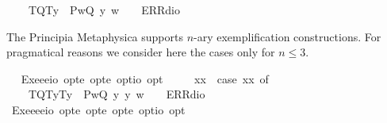 \begin{isabellebody}
\ \ \ \ {\isacharparenleft}T{\isacharparenleft}Q{\isacharparenright}{\isacharcomma}T{\isacharparenleft}y{\isacharparenright}{\isacharparenright}\ {\isasymRightarrow}\ P{\isacharparenleft}{\isasymlambda}w{\isachardot}{\isacharparenleft}Q\ y{\isacharparenright}\ w{\isacharparenright}\ {\isacharbar}\ {\isacharunderscore}\ {\isasymRightarrow}\ ERR{\isacharparenleft}dio{\isacharparenright}{\isachardoublequoteclose}%
\begin{isamarkuptext}%
The Principia Metaphysica supports $n$-ary exemplification constructions. For pragmatical 
  reasons we consider here the cases only for $n\leq 3$.%
\end{isamarkuptext}%
\isamarkuptrue%
\ \isamarkupfalse%
\ Exe{}{\isacharcolon}{\isacharcolon}{\isachardoublequoteopen}{\isacharparenleft}e{\isasymRightarrow}e{\isasymRightarrow}io{\isacharparenright}\ opt{\isasymRightarrow}e\ opt{\isasymRightarrow}e\ opt{\isasymRightarrow}io\ opt{\isachardoublequoteclose}\ {\isacharparenleft}{\isachardoublequoteopen}{\isasymlparr}{\isacharunderscore}{\isacharcomma}{\isacharunderscore}{\isacharcomma}{\isacharunderscore}{\isasymrparr}{\isachardoublequoteclose}{\isacharparenright}\ \isanewline
\ \ \ {\isachardoublequoteopen}{\isasymlparr}{\isasymPhi}{\isacharcomma}x{}{\isacharcomma}x{}{\isasymrparr}\ {\isasymequiv}\ case\ {\isacharparenleft}{\isasymPhi}{\isacharcomma}x{}{\isacharcomma}x{}{\isacharparenright}\ of\ \isanewline
\ \ \ \ {\isacharparenleft}T{\isacharparenleft}Q{\isacharparenright}{\isacharcomma}T{\isacharparenleft}y{}{\isacharparenright}{\isacharcomma}T{\isacharparenleft}y{}{\isacharparenright}{\isacharparenright}\ {\isasymRightarrow}\ P{\isacharparenleft}{\isasymlambda}w{\isachardot}{\isacharparenleft}Q\ y{}\ y{}{\isacharparenright}\ w{\isacharparenright}\ {\isacharbar}\ {\isacharunderscore}\ {\isasymRightarrow}\ ERR{\isacharparenleft}dio{\isacharparenright}{\isachardoublequoteclose}\isanewline
\ \isamarkupfalse%
\ Exe{}{\isacharcolon}{\isacharcolon}{\isachardoublequoteopen}{\isacharparenleft}e{\isasymRightarrow}e{\isasymRightarrow}e{\isasymRightarrow}io{\isacharparenright}\ opt{\isasymRightarrow}e\ opt{\isasymRightarrow}e\ opt{\isasymRightarrow}e\ opt{\isasymRightarrow}io\ opt{\isachardoublequoteclose}\ {\isacharparenleft}{\isachardoublequoteopen}{\isasymlparr}{\isacharunderscore}{\isacharcomma}{\isacharunderscore}{\isacharcomma}{\isacharunderscore}{\isacharcomma}{\isacharunderscore}{\isasymrparr}{\isachardoublequoteclose}{\isacharparenright}\ \ \isanewline

\end{isabellebody}

